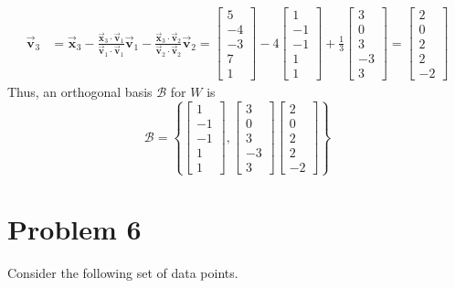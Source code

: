 \documentclass[letter,11pt]{article}
\theoremstyle{definition}
\begin{document}
\begin{tcolorbox}[boxrule=1mm,enhanced jigsaw, breakable,before=\hfill,after=\hfill,adjusted title={Problem 5 solutions}]
\begin{align*}
\vec{\boldsymbol{v}}_3 & =\vec{\boldsymbol{x}}_3-\frac{\vec{\boldsymbol{x}}_3 \cdot \vec{\boldsymbol{v}}_1}{\vec{\boldsymbol{v}}_1 \cdot \vec{\boldsymbol{v}}_1} \vec{\boldsymbol{v}}_1-\frac{\vec{\boldsymbol{x}}_3 \cdot \vec{\boldsymbol{v}}_2}{\vec{\boldsymbol{v}}_2 \cdot \vec{\boldsymbol{v}}_2} \vec{\boldsymbol{v}}_2 = \begin{bmatrix}5\\-4\\-3\\7\\1 \end{bmatrix} - 4\begin{bmatrix}1\\-1\\-1\\1\\1 \end{bmatrix} + \frac{1}{3}\begin{bmatrix}3\\0\\3\\-3\\3 \end{bmatrix} = \begin{bmatrix}2\\0\\2\\2\\-2 \end{bmatrix}
\end{align*}
Thus, an orthogonal basis $\mathcal{B}$ for $W$ is
$$\boxed{\mathcal{B} = \left\{\begin{bmatrix}1\\-1\\-1\\1\\1 \end{bmatrix},\begin{bmatrix}3\\0\\3\\-3\\3 \end{bmatrix} \begin{bmatrix}2\\0\\2\\2\\-2 \end{bmatrix}\right\}}$$
\end{tcolorbox}

\section{Problem 6}
Consider the following set of data points.
\end{document}
